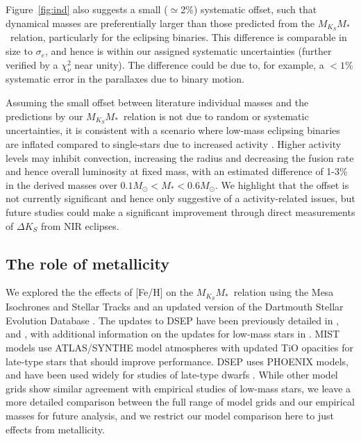 \documentclass[twocolumn]{aastex62}
\newcommand{\mmk}{$M_{K_S}$\textendash$M_*$}
\begin{document}
Figure~\ref{fig:ind} also suggests a small ($\simeq$2\%) systematic offset, such that dynamical masses are preferentially larger than those predicted from the \mmk\ relation, particularly for the eclipsing binaries. This difference is comparable in size to $\sigma_e$, and hence is within our assigned systematic uncertainties (further verified by a $\chi^2_\nu$ near unity). The difference could be due to, for example, a $<1$\% systematic error in the parallaxes due to binary motion. 

Assuming the small offset between literature individual masses and the predictions by our \mmk\ relation is not due to random or systematic uncertainties, it is consistent with a scenario where low-mass eclipsing binaries are inflated compared to single-stars due to increased activity \citep[e.g.,][]{MacDonald2012, Feiden2013,Feiden2014a,Somers2017}. Higher activity levels may inhibit convection, increasing the radius and decreasing the fusion rate and hence overall luminosity at fixed mass, with an estimated difference of 1-3\% in the derived masses over $0.1M_\odot<M_*<0.6M_\odot$. We highlight that the offset is not currently significant and hence only suggestive of a activity-related issues, but future studies could make a significant improvement through direct measurements of $\Delta K_S$ from NIR eclipses. 

\subsection{The role of metallicity}\label{sec:metal}

We explored the the effects of [Fe/H] on the \mmk\ relation using the Mesa Isochrones and Stellar Tracks \citep[MIST,][]{MIST0,MIST1} and an updated version of the Dartmouth Stellar Evolution Database \citep[DSEP,][]{Dotter2008}. The updates to DSEP have been previously detailed in \citet{Feiden2013,Feiden2014a}, and \citet{Muirhead2014}, with additional information on the updates for low-mass stars in \citet{Mann2015b}. MIST models use ATLAS/SYNTHE model atmospheres \citep{2004astro.ph..5087C} with updated TiO opacities for late-type stars that should improve performance. DSEP uses PHOENIX \cite{Hauschildt1999,1999ApJ...525..871H} models, and have been used widely for studies of late-type dwarfs \citep[e.g.,][]{Boyajian2012,2015MNRAS.454..593B,Kesseli:2018aa}. While other model grids \citep[e.g.,YaPSI, PARSEC, Lyon][]{Spada2013,Chen2014,BHAC15} show similar agreement with empirical studies of low-mass stars, we leave a more detailed comparison between the full range of model grids and our empirical masses for future analysis, and we restrict our model comparison here to just effects from metallicity. 
\end{document}
